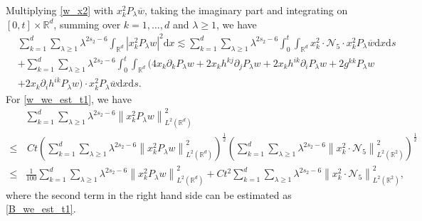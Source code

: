 \documentclass[10pt,twoside,a4paper]{article}
\numberwithin{equation}{section}\allowdisplaybreaks
\def\leq{\leqslant}
\def\geq{\geqslant}
\begin{document}
	Multiplying \eqref{w_x2} with $x^2_k P_{\lambda }  \overline{w}   $, taking the imaginary part and integrating on $ [0,t]\times \mathbb{R}^d $, summing over $k=1,\dots,d$ and $\lambda\geq 1$, we have
	\begin{align}
		& \sum_{k=1}^d \sum_{\lambda \geq 1} \lambda^{2 s_2-6 }\int_{\mathbb{R}^{d}} \left| x_k^2P_{\lambda }  w\right|^2 \mathrm{d} x  \lesssim   \sum_{k=1}^d   \sum_{\lambda \geq 1} \lambda^{2 s_2-6 }\int_0^t \int_{\mathbb{R}^{d}} x^2_k \cdot\mathcal{N}_5 \cdot x^2_k P_{\lambda }  \overline{w}  \mathrm{d} x \mathrm{d} s \label{w_we_est_t1}\\
		&+ \sum_{k=1}^d \sum_{\lambda \geq 1} \lambda^{2 s_2-6 }\int_0^t \int_{\mathbb{R}^{d}}  (4 x_k \partial_k  P_{\lambda }  w +2 x_k h^{kj}  \partial_j P_{\lambda }  w+2 x_k h^{ik} \partial_i P_{\lambda }  w +2 g^{kk}P_{\lambda }  w \nonumber\\
		&+2 x_k \partial_i h^{ik}P_{\lambda }  w)\cdot x^2_k P_{\lambda }  \overline{w}  \mathrm{d} x \mathrm{d} s. \label{w_we_est_t2}
	\end{align}
	For  \eqref{w_we_est_t1}, we have
	\begin{align*} 
		&\sum_{k=1}^d  \sum_{\lambda \geq 1} \lambda^{2 s_2-6 } \left\| x_k^2 P_{\lambda }  w\right\|_{L^{2}(\mathbb{R}^d)}^2\\
		\leq & \, C t  \left(\sum_{k=1}^d  \sum_{\lambda \geq 1} \lambda^{2 s_2-6 } \left\| x_k^2 P_{\lambda }  w\right\|_{L^{2}(\mathbb{R}^d)}^2\right)^{\frac 12}   \left( \sum_{k=1}^d \sum_{\lambda \geq 1} \lambda^{2 s_2-6 }    \left\|x^2_k \cdot\mathcal{N}_5 \right\|_{L^2(\mathbb{R}^2)}^2 \right)^{\frac 12}\\
		\leq & \frac{1}{100} \sum_{k=1}^d  \sum_{\lambda \geq 1} \lambda^{2 s_2-6 } \left\| x_k^2 P_{\lambda }  w\right\|_{L^{2}(\mathbb{R}^d)}^2 +Ct^2\sum_{k=1}^d \sum_{\lambda \geq 1} \lambda^{2 s_2-6 }    \left\|x^2_k \cdot\mathcal{N}_5 \right\|_{L^2(\mathbb{R}^2)}^2,
	\end{align*}
	where the second term in the right hand side can be estimated as \eqref{B_we_est_t1}. 
	
\end{document}
